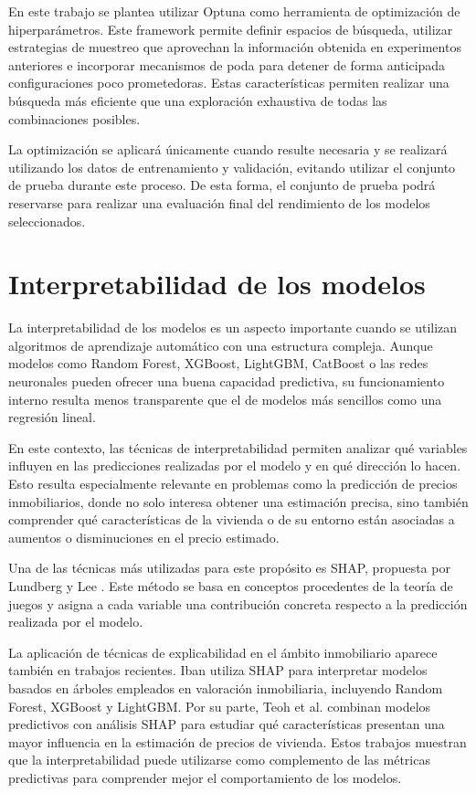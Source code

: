 \documentclass[IB]{TFUOC}%
\begin{document}
En este trabajo se plantea utilizar Optuna \cite{akiba2019optuna} como herramienta de optimización de hiperparámetros. Este framework permite definir espacios de búsqueda, utilizar estrategias de muestreo que aprovechan la información obtenida en experimentos anteriores e incorporar mecanismos de poda para detener de forma anticipada configuraciones poco prometedoras. Estas características permiten realizar una búsqueda más eficiente que una exploración exhaustiva de todas las combinaciones posibles.

La optimización se aplicará únicamente cuando resulte necesaria y se realizará utilizando los datos de entrenamiento y validación, evitando utilizar el conjunto de prueba durante este proceso. De esta forma, el conjunto de prueba podrá reservarse para realizar una evaluación final del rendimiento de los modelos seleccionados.

\section{Interpretabilidad de los modelos}

La interpretabilidad de los modelos es un aspecto importante cuando se utilizan algoritmos de aprendizaje automático con una estructura compleja. Aunque modelos como Random Forest, XGBoost, LightGBM, CatBoost o las redes neuronales pueden ofrecer una buena capacidad predictiva, su funcionamiento interno resulta menos transparente que el de modelos más sencillos como una regresión lineal.

En este contexto, las técnicas de interpretabilidad permiten analizar qué variables influyen en las predicciones realizadas por el modelo y en qué dirección lo hacen. Esto resulta especialmente relevante en problemas como la predicción de precios inmobiliarios, donde no solo interesa obtener una estimación precisa, sino también comprender qué características de la vivienda o de su entorno están asociadas a aumentos o disminuciones en el precio estimado.

Una de las técnicas más utilizadas para este propósito es SHAP, propuesta por Lundberg y Lee \cite{lundberg2017shap}. Este método se basa en conceptos procedentes de la teoría de juegos y asigna a cada variable una contribución concreta respecto a la predicción realizada por el modelo.

La aplicación de técnicas de explicabilidad en el ámbito inmobiliario aparece también en trabajos recientes. Iban \cite{iban2022explainable} utiliza SHAP para interpretar modelos basados en árboles empleados en valoración inmobiliaria, incluyendo Random Forest, XGBoost y LightGBM. Por su parte, Teoh et al. \cite{teoh2023explainable} combinan modelos predictivos con análisis SHAP para estudiar qué características presentan una mayor influencia en la estimación de precios de vivienda. Estos trabajos muestran que la interpretabilidad puede utilizarse como complemento de las métricas predictivas para comprender mejor el comportamiento de los modelos.
\end{document}

